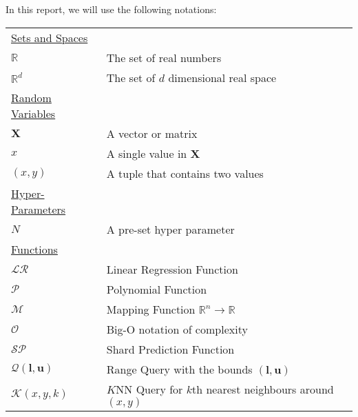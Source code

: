 In this report, we will use the following notations:

\begin{table}[h]
\begin{tabularx}{\textwidth}{@{}XX@{}}
\toprule
  \underline{Sets and Spaces} \\
  $\mathbb{R}$ & The set of real numbers \\
  $\mathbb{R}^d$ & The set of $d$ dimensional real space \\
  \underline{Random Variables} \\
  $\boldsymbol{X}$ & A vector or matrix \\
  $x$ & A single value in $\textbf{X}$ \\
  $(x,y)$ & A tuple that contains two values \\	
  \underline{Hyper-Parameters} \\
  $N$   & A pre-set hyper parameter \\
  \underline{Functions} \\
  $\mathcal{LR}$ & Linear Regression Function\\
  $\mathcal{P}$ & Polynomial Function\\
  $\mathcal{M}$ & Mapping Function $\mathbb{R}^n\to\mathbb{R}$\\
  $\mathcal{O}$ & Big-O notation of complexity\\
  $\mathcal{SP}$ & Shard Prediction Function\\
  $\mathcal{Q}(\boldsymbol{l},\boldsymbol{u})$ & Range Query with the bounds $(\boldsymbol{l}, \boldsymbol{u})$\\
  $\mathcal{K}(x,y,k)$ & $K$NN Query for $k$th nearest neighbours around $(x,y)$\\
\bottomrule
\end{tabularx}
\end{table}
